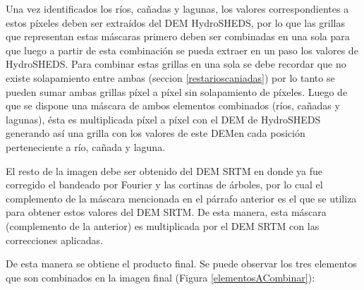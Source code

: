 \documentclass[10pt,a4paper, twoside]{report}
\begin{document}
Una vez identificados los ríos, cañadas y lagunas, los valores correspondientes a estos píxeles deben ser extraídos del DEM HydroSHEDS, por lo que las grillas que representan estas máscaras primero deben ser combinadas en una sola para que luego a partir de esta combinación se pueda extraer en un paso los valores de HydroSHEDS. Para combinar estas grillas en una sola se debe recordar que no existe solapamiento entre ambas (seccion \ref{restarioscaniadas}) por lo tanto se pueden sumar ambas grillas píxel a píxel sin solapamiento de píxeles. Luego de que se dispone una máscara de ambos elementos combinados (ríos, cañadas y lagunas), ésta es multiplicada píxel a píxel con el DEM de HydroSHEDS generando así una grilla con los valores de este DEMen cada posición perteneciente a río, cañada y laguna.

El resto de la imagen debe ser obtenido del DEM SRTM en donde ya fue corregido el bandeado por Fourier y las cortinas de árboles, por lo cual el complemento de la máscara mencionada en el párrafo anterior es el que se utiliza para obtener estos valores del DEM SRTM. De esta manera, esta máscara (complemento de la anterior) es multiplicada por el DEM SRTM con las correcciones aplicadas.

De esta manera se obtiene el producto final. Se puede observar los tres elementos que son combinados en la imagen final (Figura \ref{elementosACombinar}):
\end{document}
